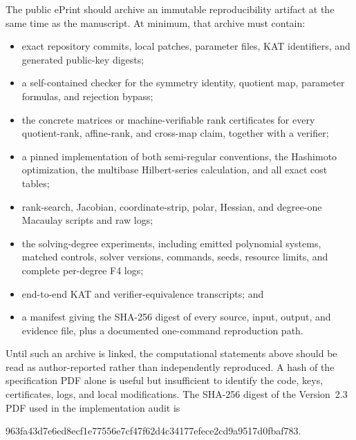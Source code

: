 \documentclass[11pt]{article}
\begin{document}
The public ePrint should archive an immutable reproducibility artifact at the
same time as the manuscript.  At minimum, that archive must contain:
\begin{itemize}
\item exact repository commits, local patches, parameter files, KAT identifiers, and generated public-key digests;
\item a self-contained checker for the symmetry identity, quotient map, parameter formulas, and rejection bypass;
\item the concrete matrices or machine-verifiable rank certificates for every quotient-rank, affine-rank, and cross-map claim, together with a verifier;
\item a pinned implementation of both semi-regular conventions, the Hashimoto optimization, the multibase Hilbert-series calculation, and all exact cost tables;
\item rank-search, Jacobian, coordinate-strip, polar, Hessian, and degree-one Macaulay scripts and raw logs;
\item the solving-degree experiments, including emitted polynomial systems, matched controls, solver versions, commands, seeds, resource limits, and complete per-degree F4 logs;
\item end-to-end KAT and verifier-equivalence transcripts; and
\item a manifest giving the SHA-256 digest of every source, input, output, and evidence file, plus a documented one-command reproduction path.
\end{itemize}
Until such an archive is linked, the computational statements above should be
read as author-reported rather than independently reproduced.  A hash of the
specification PDF alone is useful but insufficient to identify the code, keys,
certificates, logs, and local modifications.  The SHA-256 digest of the
Version~2.3 PDF used in the implementation audit is
\begin{center}
\ttfamily\small 963fa43d7e6ed8ecf1e77556e7cf47f62d4c34177efece2cd9a9517d0fbaf783.
\end{center}

\printbibliography
\end{document}
